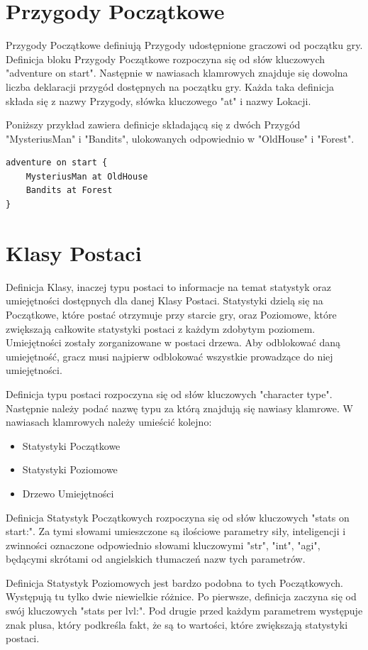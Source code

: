 \documentclass	{xmgr}
\begin{document}
\section{Przygody Początkowe} 
Przygody Początkowe definiują Przygody udostępnione graczowi od początku gry. Definicja bloku Przygody Początkowe rozpoczyna się od słów kluczowych "adventure on start". Następnie w nawiasach klamrowych znajduje się dowolna liczba deklaracji przygód dostępnych na początku gry.
Każda taka definicja składa się z nazwy Przygody, słówka kluczowego "at" i nazwy Lokacji.

Poniższy przykład zawiera definicje składającą się z dwóch Przygód "MysteriusMan" i "Bandits", ulokowanych odpowiednio w "OldHouse" i "Forest".

\begin{lstlisting}
adventure on start {
	MysteriusMan at OldHouse
	Bandits at Forest
}
\end{lstlisting}

\section{Klasy Postaci}
Definicja Klasy, inaczej typu postaci to informacje na temat statystyk oraz umiejętności dostępnych dla danej Klasy Postaci. Statystyki dzielą się na Początkowe, które postać otrzymuje przy starcie gry, oraz Poziomowe, które zwiększają całkowite statystyki postaci z każdym zdobytym poziomem. Umiejętności zostały zorganizowane w postaci drzewa. Aby odblokować daną umiejętność, gracz musi najpierw odblokować wszystkie prowadzące do niej umiejętności.

Definicja typu postaci rozpoczyna się od słów kluczowych "character type". Następnie należy podać nazwę typu za którą znajdują się nawiasy klamrowe. W nawiasach klamrowych należy umieścić kolejno:
\begin{itemize}
	\item Statystyki Początkowe
	\item Statystyki Poziomowe
	\item Drzewo Umiejętności
\end{itemize}

Definicja Statystyk Początkowych rozpoczyna się od słów kluczowych "stats on start:". Za tymi słowami umieszczone są ilościowe parametry siły, inteligencji i zwinności oznaczone odpowiednio słowami kluczowymi "str", "int", "agi", będącymi skrótami od angielskich tłumaczeń nazw tych parametrów.

Definicja Statystyk Poziomowych jest bardzo podobna to tych Początkowych. Występują tu tylko dwie niewielkie różnice. Po pierwsze, definicja zaczyna się od swój kluczowych "stats per lvl:". Pod drugie przed każdym parametrem występuje znak plusa, który podkreśla fakt, że są to wartości, które zwiększają statystyki postaci. 
\end{document}
